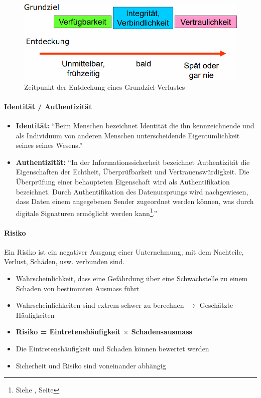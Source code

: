 \documentclass[10pt,a4paper]{article}
\begin{document}
\begin{figure}[H]
    \begin{center}
    \includegraphics[width=16cm]{images/grundziel-entdeckung.png}
    \caption{Zeitpunkt der Entdeckung eines Grundziel-Verlustes}
    \label{grundziel-entdeckung}
    \end{center}
\end{figure}

\paragraph*{Identität / Authentizität}
\begin{itemize}[noitemsep,topsep=0pt,leftmargin=*]
    \item \textbf{Identität:} "`Beim Menschen bezeichnet Identität die ihn kennzeichnende und als Individuum von anderen Menschen unterscheidende Eigentümlichkeit seines seines Wesens."'\cite{wiki}
    \item \textbf{Authentizität:} "`In der Informationssicherheit bezeichnet Authentizität die Eigenschaften der Echtheit, Überprüfbarkeit und Vertrauenswürdigkeit. Die Überprüfung einer behaupteten Eigenschaft wird als Authentifikation bezeichnet. Durch Authentifikation des Datenursprungs wird nachgewiesen, dass Daten einem angegebenen Sender zugeordnet werden können, was durch digitale Signaturen ermöglicht werden kann\footnote{Siehe \underline{}, Seite \pageref{para:Authentifizierung}}."'\cite{wiki}
\end{itemize}

\paragraph*{Risiko}\label{para:Risiko}Ein Risiko ist ein negativer Ausgang einer Unternehmung, mit dem Nachteile, Verlust, Schäden, usw. verbunden sind.
\begin{itemize}[noitemsep,topsep=0pt,leftmargin=*]
    \item Wahrscheinlichkeit, dass eine Gefährdung über eine Schwachstelle zu einem Schaden von bestimmten Ausmass führt
    \item Wahrscheinlichkeiten sind extrem schwer zu berechnen $\rightarrow$ Geschätzte Häufigkeiten
    \item \textbf{Risiko = Eintretenshäufigkeit $\times$ Schadensausmass}
    \item Die Eintretenshäufigkeit und Schaden können bewertet werden
    \item Sicherheit und Risiko sind voneinander abhängig
\end{itemize}
\end{document}

